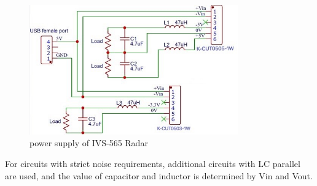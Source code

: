 \begin{figure}[H]
    \centering
    \includegraphics[width=0.8\textwidth]{figure/powersupplycircuit.jpg}
    \caption{power supply of IVS-565 Radar}
    \label{fig:power_radar}
\end{figure}

For circuits with strict noise requirements, additional circuits with LC parallel are used, and the value of capacitor and inductor is determined by Vin and Vout.
